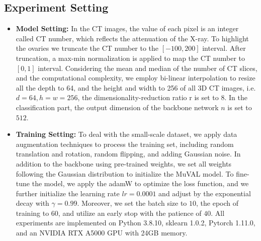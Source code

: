\subsection{Experiment Setting}
\begin{itemize}

\item \textbf{Model Setting:} 
In the CT images, the value of each pixel is an integer called CT number, which reflects the attenuation of the X-ray. 
To highlight the ovaries we truncate the CT number to the $[-100, 200]$ interval. 
After truncation, a max-min normalization is applied to map the CT number to $[0, 1]$ interval. 
Considering the mean and median of the number of CT slices, and the computational complexity, we employ bi-linear interpolation to resize all the depth to 64, and the height and width to 256 of all 3D CT images, i.e. $d = 64, h = w = 256$, the dimensionality-reduction ratio r is set to $8$. 
In the classification part, the output dimension of the backbone network $n$ is set to $512$.

\item \textbf{Training Setting:}  
To deal with the small-scale dataset, we apply data augmentation techniques to process the training set, including random translation and rotation, random flipping, and adding Gaussian noise.
In addition to the backbone using pre-trained weights, we set all weights following the Gaussian distribution to initialize the MuVAL model. 
To fine-tune the model, we apply the adamW \cite{loshchilov2017decoupled} to optimize the loss function, and we further initialize the learning rate $lr=0.0001$ and adjust by the exponential decay with $\gamma=0.99$. Moreover, we set the batch size to $10$, the epoch of training to $60$, and utilize an early stop with the patience of $40$. All experiments are implemented on Python 3.8.10, sklearn 1.0.2, Pytorch 1.11.0, and an NVIDIA RTX A5000 GPU with 24GB memory.


\end{itemize}
